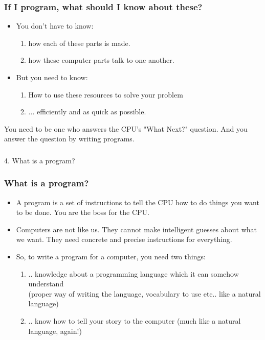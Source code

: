 \documentclass{beamer}
\begin{document}
\begin{frame}
\frametitle{If I program, what should I know about these?}
\begin{itemize}
\item You don't have to know:
\begin{enumerate}
\item how each of these parts is made. 
\item how these computer parts talk to one another.
\end{enumerate}
\item But you need to know: 
\begin{enumerate}
\item How to use these resources to solve your problem
\item ... efficiently and as quick as possible.
\end{enumerate}
\end{itemize}
\medskip
You need to be one who answers the CPU's "What Next?" question. And you answer the question by writing programs.
\end{frame}

\begin{frame}
\frametitle{}
\begin{center}
\Large 4. What is a program?
\end{center}
\end{frame}

\begin{frame}
\frametitle{What is a program?}
\begin{itemize}
\item A program is a set of instructions to tell the CPU how to do things you want to be done. You are the boss for the CPU.
\item Computers are not like us. They cannot make intelligent guesses about what we want. They need concrete and precise instructions for everything.
\item So, to write a program for a computer, you need two things:
\begin{enumerate}
\item .. knowledge about a programming language which it can somehow understand \\ 
(proper way of writing the language, vocabulary to use etc.. like a natural language)
\item .. know how to tell your story to the computer (much like a natural language, again!)
\end{enumerate}
\end{itemize}
\end{frame}
\end{document}
